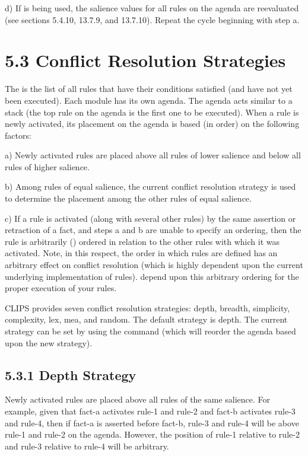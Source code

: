 \documentclass[letterpaper,10pt,english]{sphinxmanual}
\begin{document}
d) If  is being used, the salience values for all
rules on the agenda are reevaluated (see sections 5.4.10, 13.7.9, and
13.7.10). Repeat the cycle beginning with step a.


\section{5.3 Conflict Resolution Strategies}
\label{\detokenize{defrule:conflict-resolution-strategies}}
The  is the list of all rules that have their conditions
satisfied (and have not yet been executed). Each module has its own
agenda. The agenda acts similar to a stack (the top rule on the agenda
is the first one to be executed). When a rule is newly activated, its
placement on the agenda is based (in order) on the following factors:

a) Newly activated rules are placed above all rules of lower salience
and below all rules of higher salience.

b) Among rules of equal salience, the current conflict resolution
strategy is used to determine the placement among the other rules of
equal salience.

c) If a rule is activated (along with several other rules) by the same
assertion or retraction of a fact, and steps a and b are unable to
specify an ordering, then the rule is arbitrarily ()
ordered in relation to the other rules with which it was activated.
Note, in this respect, the order in which rules are defined has an
arbitrary effect on conflict resolution (which is highly dependent upon
the current underlying implementation of rules).  depend upon
this arbitrary ordering for the proper execution of your rules.

CLIPS provides seven conflict resolution strategies: depth, breadth,
simplicity, complexity, lex, mea, and random. The default strategy is
depth. The current strategy can be set by using the 
command (which will reorder the agenda based upon the new strategy).


\subsection{5.3.1 Depth Strategy}
\label{\detokenize{defrule:depth-strategy}}
Newly activated rules are placed above all rules of the same salience.
For example, given that fact-a activates rule-1 and rule-2 and fact-b
activates rule-3 and rule-4, then if fact-a is asserted before fact-b,
rule-3 and rule-4 will be above rule-1 and rule-2 on the agenda.
However, the position of rule-1 relative to rule-2 and rule-3 relative
to rule-4 will be arbitrary.
\end{document}
